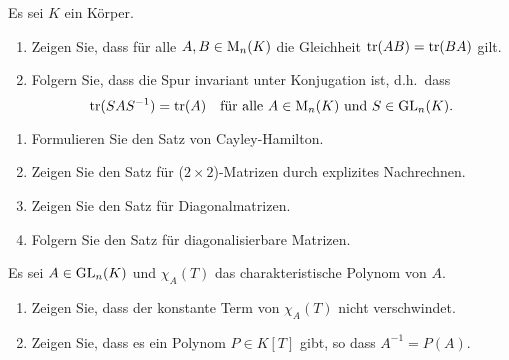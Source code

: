 

\begin{question}[subtitle = Konjugationsinvarianz der Spur]{2}
  Es sei $K$ ein Körper.
  \begin{enumerate}[leftmargin=*]
    \item
      Zeigen Sie, dass für alle $A, B \in \operatorname{M}_n(K)$ die Gleichheit $\operatorname{tr}(AB) = \operatorname{tr}(BA)$ gilt.
    \item
      Folgern Sie, dass die Spur invariant unter Konjugation ist, d.h.\ dass
      \[
        \operatorname{tr}(S A S^{-1}) = \operatorname{tr}(A)
        \quad
        \text{für alle $A \in \operatorname{M}_n(K)$ und $S \in \operatorname{GL}_n(K)$}.
      \]
  \end{enumerate}
\end{question}


\begin{question}[subtitle = Der Satz von Cayley-Hamilton]{2}
  \begin{enumerate}[leftmargin=*]
    \item
      Formulieren Sie den Satz von Cayley-Hamilton.
    \item
      Zeigen Sie den Satz für ($2 \times 2$)-Matrizen durch explizites Nachrechnen.
    \item
      Zeigen Sie den Satz für Diagonalmatrizen.
    \item
      Folgern Sie den Satz für diagonalisierbare Matrizen.
  \end{enumerate}
\end{question}


\begin{question}[subtitle = Invertieren durch das charakteristische Polynom]{2}
  Es sei $A \in \operatorname{GL}_n(K)$ und $\chi_A(T)$ das charakteristische Polynom von $A$.
  \begin{enumerate}[leftmargin=*]
    \item
      Zeigen Sie, dass der konstante Term von $\chi_A(T)$ nicht verschwindet.
    \item
      Zeigen Sie, dass es ein Polynom $P \in K[T]$ gibt, so dass $A^{-1} = P(A)$.
  \end{enumerate}
\end{question}







